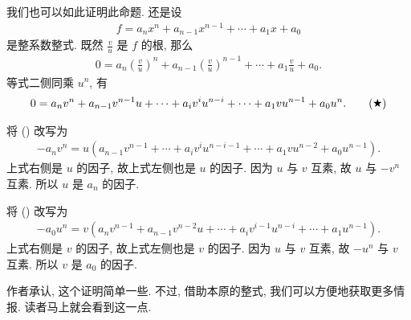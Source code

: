 \begin{remark}
    我们也可以如此证明此命题. 还是设
    \begin{align*}
        f = a_n x^n + a_{n-1} x^{n-1} + \cdots + a_1 x + a_0
    \end{align*}
    是整系数整式. 既然 $\frac{v}{u}$ 是 $f$ 的根, 那么
    \begin{align*}
        0 = a_n \left( \frac{v}{u} \right)^n + a_{n-1} \left( \frac{v}{u} \right)^{n-1} + \cdots + a_1 \frac{v}{u} + a_0.
    \end{align*}
    等式二侧同乘 $u^n$, 有
    \begin{align*}
        0 = a_n v^n + a_{n-1} v^{n-1} u + \cdots + a_{i} v^{i} u^{n-i} + \cdots + a_1 v u^{n-1} + a_0 u^n. \tag*{(\ding{72})}
    \end{align*}

    将 () 改写为
    \begin{align*}
        -a_n v^n = u (a_{n-1} v^{n-1} + \cdots + a_{i} v^{i} u^{n-i-1} + \cdots + a_1 v u^{n-2} + a_0 u^{n-1}).
    \end{align*}
    上式右侧是 $u$ 的因子, 故上式左侧也是 $u$ 的因子. 因为 $u$ 与 $v$ 互素, 故 $u$ 与 $-v^n$ 互素. 所以 $u$ 是 $a_n$ 的因子.

    将 () 改写为
    \begin{align*}
        -a_0 u^n = v (a_n v^{n-1} + a_{n-1} v^{n-2} u + \cdots + a_{i} v^{i-1} u^{n-i} + \cdots + a_1 u^{n-1}).
    \end{align*}
    上式右侧是 $v$ 的因子, 故上式左侧也是 $v$ 的因子. 因为 $u$ 与 $v$ 互素, 故 $-u^n$ 与 $v$ 互素. 所以 $v$ 是 $a_0$ 的因子.

    作者承认, 这个证明简单一些. 不过, 借助本原的整式, 我们可以方便地获取更多情报. 读者马上就会看到这一点.
\end{remark}

